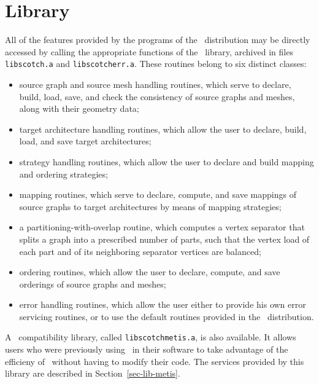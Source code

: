 
\section{Library}
\label{sec-lib}

All of the features provided by the programs of the
\scotch\ distribution may be directly accessed by calling
the appropriate functions of the \libscotch\ library, archived
in files {\tt libscotch.a} and {\tt libscotcherr.a}.
These routines belong to six distinct classes:
\begin{itemize}
\item
source graph and source mesh handling routines, which serve to declare, build,
load, save, and check the consistency of source graphs and meshes, along with
their geometry data;
\item
target architecture handling routines, which allow the user to
declare, build, load, and save target architectures;
\item
strategy handling routines, which allow the user to declare and build
mapping and ordering strategies;
\item
mapping routines, which serve to declare, compute, and save
mappings of source graphs to target architectures by means of
mapping strategies;
\item
a partitioning-with-overlap routine, which computes a vertex separator
that splits a graph into a prescribed number of parts, such that the
vertex load of each part and of its neighboring separator vertices are
balanced;
\item
ordering routines, which allow the user to declare, compute, and save
orderings of source graphs and meshes;
\item
error handling routines, which allow the user either to provide his own
error servicing routines, or to use the default routines provided
in the \libscotch\ distribution.
\end{itemize}

A \metis\ compatibility library, called {\tt lib\lbo scotch\lbo metis.a},
is also available. It allows users who were previously using
\metis\ in their software to take advantage of the efficieny of
\scotch\ without having to modify their code. The
services provided by this library are described in
Section~\ref{sec-lib-metis}.

